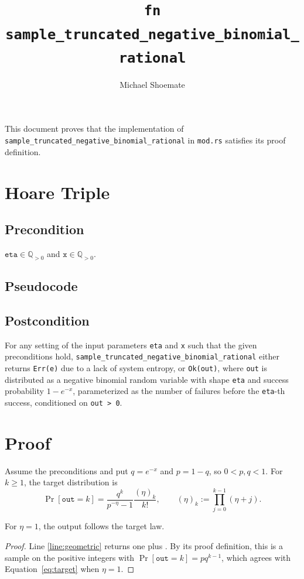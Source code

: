 \documentclass{article}
\title{\texttt{fn sample\_truncated\_negative\_binomial\_rational}}
\author{Michael Shoemate}
\begin{document}
\maketitle

This document proves that the implementation of \texttt{sample\_truncated\_negative\_binomial\_rational}
in \texttt{mod.rs} satisfies its proof definition.

\section{Hoare Triple}
\subsection*{Precondition}
$\texttt{eta} \in \mathbb{Q}_{>0}$ and $\texttt{x} \in \mathbb{Q}_{>0}$.

\subsection*{Pseudocode}


\subsection*{Postcondition}
\label{postcondition}
For any setting of the input parameters \texttt{eta} and \texttt{x} such that the given preconditions hold,
\texttt{sample\_truncated\_negative\_binomial\_rational} either returns \texttt{Err(e)} due to a lack of system entropy,
or \texttt{Ok(out)}, where \texttt{out} is distributed as a negative binomial random variable
with shape \texttt{eta} and success probability $1 - e^{-x}$, parameterized as the number of failures before
the \texttt{eta}-th success, conditioned on \texttt{out > 0}.

\section{Proof}
Assume the preconditions and put $q=e^{-x}$ and $p=1-q$, so $0<p,q<1$.
For $k\ge1$, the target distribution is
\begin{equation}
\label{eq:target}
\Pr[\texttt{out}=k]
=\frac{q^k}{p^{-\eta}-1}\frac{(\eta)_k}{k!},
\qquad (\eta)_k:=\prod_{j=0}^{k-1}(\eta+j).
\end{equation}

\begin{lemma}
\label{lem:geometric}
For $\eta=1$, the output follows the target law.
\end{lemma}
\begin{proof}
Line \ref{line:geometric} returns one plus
.
By its proof definition, this is a sample on the positive integers with
$\Pr[\texttt{out}=k]=p q^{k-1}$, which agrees with
Equation~\ref{eq:target} when $\eta=1$.
\end{proof}
\end{document}
